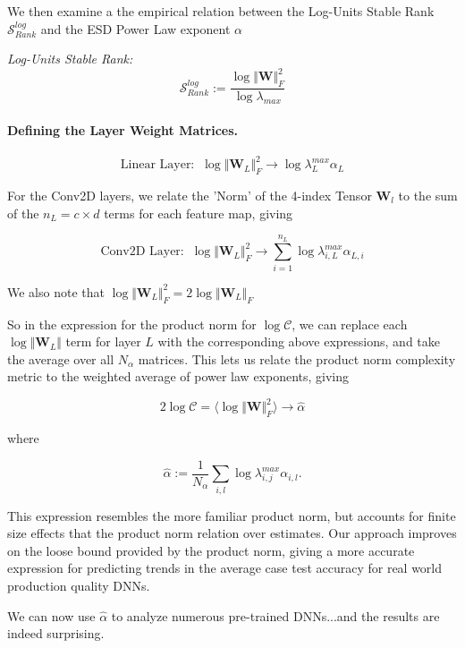
We then examine a the empirical relation between  the Log-Units Stable Rank 
$\mathcal{S}^{log}_{Rank}$ and the ESD Power Law exponent $\alpha$

\emph{Log-Units Stable Rank:  } 
$$\mathcal{S}^{log}_{Rank}:=\dfrac{\log\Vert\mathbf{W}\Vert^{2}_{F}}{\log\lambda_{max}}$$



\paragraph{Defining the Layer Weight Matrices.} 


$$\text{Linear Layer:}\;\;\log\Vert\mathbf{W}_{L}\Vert^{2}_{F}\rightarrow\log\lambda^{max}_{L}\alpha_{L}$$

For the Conv2D layers, we relate the 'Norm' of the 4-index Tensor $\mathbf{W}_{l}$ to the sum of the $n_{L}=c\times d$ terms for each feature map, giving 

$$\text{Conv2D Layer:}\;\;\log\Vert\mathbf{W}_{L}\Vert^{2}_{F}\rightarrow \sum_{i=1}^{n_{L}}\log\lambda^{max}_{i,L}\alpha_{L,i}$$

We also note that $\log\Vert\mathbf{W}_{L}\Vert^{2}_{F}=2\log\Vert\mathbf{W}_{L}\Vert_{F}$ 

So in the expression for the product norm for $\log\mathcal{C}$, we can replace each $\log\Vert\mathbf{W}_{L}\Vert$ term for layer $L$ with the corresponding above expressions, and take the average over all $N_{\alpha}$  matrices.  This lets us relate the product norm complexity metric to the weighted average of power law exponents, giving

$$2\log\mathcal{C}=\langle\log\Vert\mathbf{W}\Vert^{2}_{F}\rangle\rightarrow\hat{\alpha}$$ 

where

\begin{equation}
\hat{\alpha}:=\dfrac{1}{N_{\alpha}}\sum_{i,l}\log\lambda^{max}_{i,j}\alpha_{i,l}  .
\label{eqn:alpha_hat_specific}
\end{equation}

This expression resembles the more familiar product norm, but accounts for finite size effects that the product norm relation over estimates.
Our approach improves on the loose bound provided by the product norm, giving a more accurate expression for predicting trends
in the average case test accuracy for real world production quality DNNs.

We can now use $\hat{\alpha}$ to analyze numerous pre-trained DNNs...and the results are indeed surprising.


